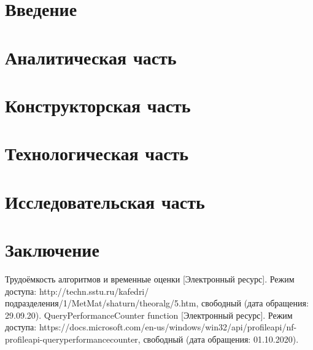 \documentclass[12pt]{report}
\begin{document}
	\renewcommand\bibname{Список литературы}
	
	
	
	\tableofcontents
	\newpage
	
	\chapter*{Введение}
	
	\newpage
	
	\chapter{Аналитическая часть}
	
	\newpage
	
	\chapter{Конструкторская часть}
	
	\newpage
	
	\chapter{Технологическая часть}
	
	\newpage
	
	\chapter{Исследовательская часть}
	
	\newpage
	
	\chapter*{Заключение}
	
	\newpage
	
	\begin{thebibliography}{2}
		 Трудоёмкость алгоритмов и временные оценки [Электронный ресурс]. Режим доступа: http://techn.sstu.ru/kafedri/подразделения/1/MetMat/shaturn/theoralg/5.htm, свободный (дата обращения: 29.09.20).
		 QueryPerformanceCounter function [Электронный ресурс]. Режим доступа: https://docs.microsoft.com/en-us/windows/win32/api/profileapi/nf-profileapi-queryperformancecounter, свободный (дата обращения: 01.10.2020).
	\end{thebibliography}
\end{document}
